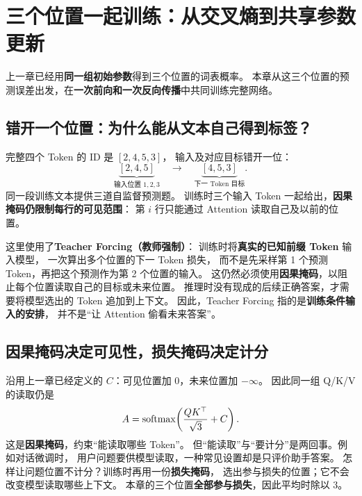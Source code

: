 \chapterrule
\section{三个位置一起训练：从交叉熵到共享参数更新}
\label{intro:language-model-training}
上一章已经用\textbf{同一组初始参数}得到三个位置的词表概率。
本章从这三个位置的预测误差出发，在\textbf{一次前向和一次反向传播}中共同训练完整网络。

\subsection{错开一个位置：为什么能从文本自己得到标签？}
\label{concept:shifted-targets}

完整四个 Token 的 ID 是 $[2,4,5,3]$，
输入及对应目标错开一位：
\[
\underbrace{[2,4,5]}_{\text{输入位置 }1,2,3}
\quad\longrightarrow\quad
\underbrace{[4,5,3]}_{\text{下一 Token 目标}}.
\]
同一段训练文本提供三道自监督预测题。
训练时三个输入 Token 一起给出，\textbf{因果掩码仍限制每行的可见范围}：
第 $i$ 行只能通过 Attention 读取自己及以前的位置。

\label{concept:teacher-forcing}
这里使用了\textbf{Teacher Forcing（教师强制）}：
训练时将\textbf{真实的已知前缀 Token} 输入模型，
一次算出多个位置的下一 Token 损失，
而不是先采样第 1 个预测 Token，再把这个预测作为第 2 个位置的输入。
这仍然必须使用\textbf{因果掩码}，以阻止每个位置读取自己的目标或未来位置。
推理时没有现成的后续正确答案，才需要将模型选出的 Token 追加到上下文。
因此，Teacher Forcing 指的是\textbf{训练条件输入的安排}，
并不是“让 Attention 偷看未来答案”。

\subsection{因果掩码决定可见性，损失掩码决定计分}
\label{concept:loss-mask}

沿用上一章已经定义的 $C$：可见位置加 $0$，未来位置加 $-\infty$。
因此同一组 Q/K/V 的读取仍是
\begin{equation}
A=\operatorname{softmax}\!\left(\frac{QK^\top}{\sqrt3}+C\right).
\label{eq:masked-language-model}
\end{equation}
这是\textbf{因果掩码}，约束“能读取哪些 Token”。
但“能读取”与“要计分”是两回事。例如对话微调时，
用户问题要供模型读取，一种常见设置却是只评价助手答案。
怎样让问题位置不计分？训练时再用一份\textbf{损失掩码}，
选出参与损失的位置；它不会改变模型读取哪些上下文。
本章的三个位置\textbf{全部参与损失}，因此平均时除以 $3$。

